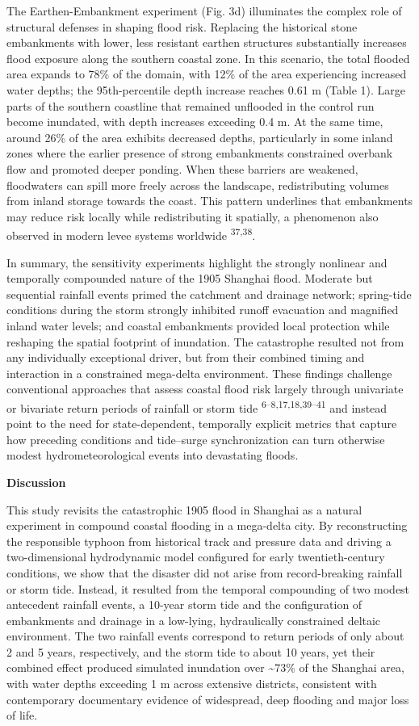 \documentclass[
]{article}
\begin{document}
The Earthen-Embankment experiment (Fig. 3d) illuminates the complex role
of structural defenses in shaping flood risk. Replacing the historical
stone embankments with lower, less resistant earthen structures
substantially increases flood exposure along the southern coastal zone.
In this scenario, the total flooded area expands to 78\% of the domain,
with 12\% of the area experiencing increased water depths; the
95th-percentile depth increase reaches 0.61 m (Table 1). Large parts of
the southern coastline that remained unflooded in the control run become
inundated, with depth increases exceeding 0.4 m. At the same time,
around 26\% of the area exhibits decreased depths, particularly in some
inland zones where the earlier presence of strong embankments
constrained overbank flow and promoted deeper ponding. When these
barriers are weakened, floodwaters can spill more freely across the
landscape, redistributing volumes from inland storage towards the coast.
This pattern underlines that embankments may reduce risk locally while
redistributing it spatially, a phenomenon also observed in modern levee
systems worldwide \textsuperscript{37,38}.

In summary, the sensitivity experiments highlight the strongly nonlinear
and temporally compounded nature of the 1905 Shanghai flood. Moderate
but sequential rainfall events primed the catchment and drainage
network; spring-tide conditions during the storm strongly inhibited
runoff evacuation and magnified inland water levels; and coastal
embankments provided local protection while reshaping the spatial
footprint of inundation. The catastrophe resulted not from any
individually exceptional driver, but from their combined timing and
interaction in a constrained mega-delta environment. These findings
challenge conventional approaches that assess coastal flood risk largely
through univariate or bivariate return periods of rainfall or storm tide
\textsuperscript{6--8,17,18,39--41} and instead point to the need for
state-dependent, temporally explicit metrics that capture how preceding
conditions and tide--surge synchronization can turn otherwise modest
hydrometeorological events into devastating floods.

\textbf{Discussion}

This study revisits the catastrophic 1905 flood in Shanghai as a natural
experiment in compound coastal flooding in a mega-delta city. By
reconstructing the responsible typhoon from historical track and
pressure data and driving a two-dimensional hydrodynamic model
configured for early twentieth-century conditions, we show that the
disaster did not arise from record-breaking rainfall or storm tide.
Instead, it resulted from the temporal compounding of two modest
antecedent rainfall events, a 10-year storm tide and the configuration
of embankments and drainage in a low-lying, hydraulically constrained
deltaic environment. The two rainfall events correspond to return
periods of only about 2 and 5 years, respectively, and the storm tide to
about 10 years, yet their combined effect produced simulated inundation
over \textasciitilde73\% of the Shanghai area, with water depths
exceeding 1 m across extensive districts, consistent with contemporary
documentary evidence of widespread, deep flooding and major loss of
life.
\end{document}
